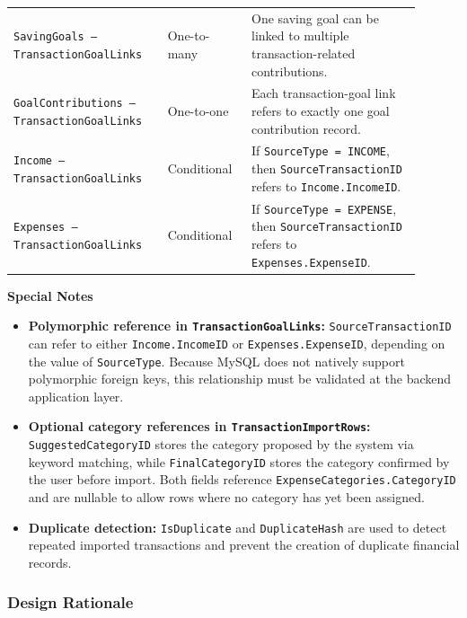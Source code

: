 ﻿\documentclass{article}
\begin{document}
\begin{longtable}{
    >{\raggedright\arraybackslash}p{0.34\linewidth}
    >{\centering\arraybackslash}p{0.18\linewidth}
    J{0.38\linewidth}
}
\texttt{SavingGoals -- TransactionGoalLinks}
& One-to-many
& One saving goal can be linked to multiple transaction-related contributions. \\

\texttt{GoalContributions -- TransactionGoalLinks}
& One-to-one
& Each transaction-goal link refers to exactly one goal contribution record. \\

\texttt{Income -- TransactionGoalLinks}
& Conditional
& If \texttt{SourceType = INCOME}, then \texttt{SourceTransactionID} refers to \texttt{Income.IncomeID}. \\

\texttt{Expenses -- TransactionGoalLinks}
& Conditional
& If \texttt{SourceType = EXPENSE}, then \texttt{SourceTransactionID} refers to \texttt{Expenses.ExpenseID}. \\

\end{longtable}

\textbf{Special Notes}

\begin{itemize}
    \item \textbf{Polymorphic reference in \texttt{TransactionGoalLinks}:}
    \texttt{SourceTransactionID} can refer to either \texttt{Income.IncomeID} or
    \texttt{Expenses.ExpenseID}, depending on the value of \texttt{SourceType}.
    Because MySQL does not natively support polymorphic foreign keys, this relationship
    must be validated at the backend application layer.

    \item \textbf{Optional category references in \texttt{TransactionImportRows}:}
    \texttt{SuggestedCategoryID} stores the category proposed by the system via keyword
    matching, while \texttt{FinalCategoryID} stores the category confirmed by the user
    before import. Both fields reference \texttt{ExpenseCategories.CategoryID} and are
    nullable to allow rows where no category has yet been assigned.

    \item \textbf{Duplicate detection:}
    \texttt{IsDuplicate} and \texttt{DuplicateHash} are used to detect repeated imported
    transactions and prevent the creation of duplicate financial records.
\end{itemize}

\subsubsection{Design Rationale}
\end{document}
